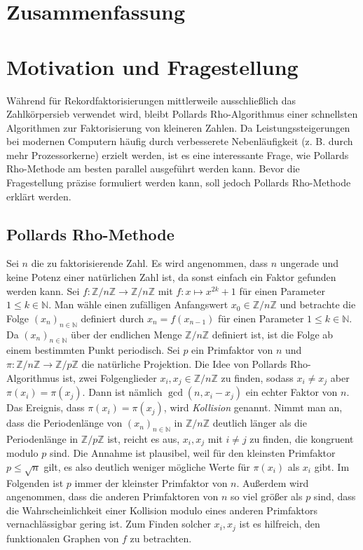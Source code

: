 \documentclass[a4paper, 10pt, ngerman]{article}
\newcommand{\N}{\mathbb{N}}
\newcommand{\Z}{\mathbb{Z}}
\begin{document}
\newpage

\section{Zusammenfassung}

\section{Motivation und Fragestellung}

Während für Rekordfaktorisierungen mittlerweile ausschließlich das Zahlkörpersieb verwendet wird, bleibt Pollards Rho-Algorithmus einer schnellsten Algorithmen zur Faktorisierung von kleineren Zahlen. Da Leistungssteigerungen bei modernen Computern häufig durch verbesserete Nebenläufigkeit (z. B. durch mehr Prozessorkerne) erzielt werden, ist es eine interessante Frage, wie Pollards Rho-Methode am besten parallel ausgeführt werden kann. Bevor die Fragestellung präzise formuliert werden kann, soll jedoch Pollards Rho-Methode erklärt werden.

\subsection{Pollards Rho-Methode}

Sei $n$ die zu faktorisierende Zahl. Es wird angenommen, dass $n$ ungerade und keine Potenz einer natürlichen Zahl ist, da sonst einfach ein Faktor gefunden werden kann. Sei $f : \Z/n\Z \to \Z/n\Z$ mit $f : x \mapsto x^{2k} + 1$ für einen Parameter $1 \le k \in \N$. Man wähle einen zufälligen Anfangswert $x_0 \in \Z/n\Z$ und betrachte die Folge $(x_n)_{n \in \N}$ definiert durch $x_n = f(x_{n - 1})$ für einen Parameter $1 \le k \in \N$. Da $(x_n)_{n \in \N}$ über der endlichen Menge $\Z/n\Z$ definiert ist, ist die Folge ab einem bestimmten Punkt periodisch. Sei $p$ ein Primfaktor von $n$ und $\pi : \Z/n\Z \to \Z/p\Z$ die natürliche Projektion. Die Idee von Pollards Rho-Algorithmus ist, zwei Folgenglieder $x_i, x_j \in \Z/n\Z$ zu finden, sodass $x_i \ne x_j$ aber $\pi(x_i) = \pi(x_j)$. Dann ist nämlich $\gcd(n, x_i - x_j)$ ein echter Faktor von $n$. Das Ereignis, dass $\pi(x_i) = \pi(x_j)$, wird \emph{Kollision} genannt. Nimmt man an, dass die Periodenlänge von $(x_n)_{n \in \N}$ in $\Z/n\Z$ deutlich länger als die Periodenlänge in $\Z/p\Z$ ist, reicht es aus, $x_i, x_j$ mit $i \ne j$ zu finden, die kongruent modulo $p$ sind. Die Annahme ist plausibel, weil für den kleinsten Primfaktor $p \le \sqrt n$ gilt, es also deutlich weniger mögliche Werte für $\pi(x_i)$ als $x_i$ gibt. Im Folgenden ist $p$ immer der kleinster Primfaktor von $n$. Außerdem wird angenommen, dass die anderen Primfaktoren von $n$ so viel größer als $p$ sind, dass die Wahrscheinlichkeit einer Kollision modulo eines anderen Primfaktors vernachlässigbar gering ist. Zum Finden solcher $x_i, x_j$ ist es hilfreich, den funktionalen Graphen von $f$ zu betrachten.
\end{document}
